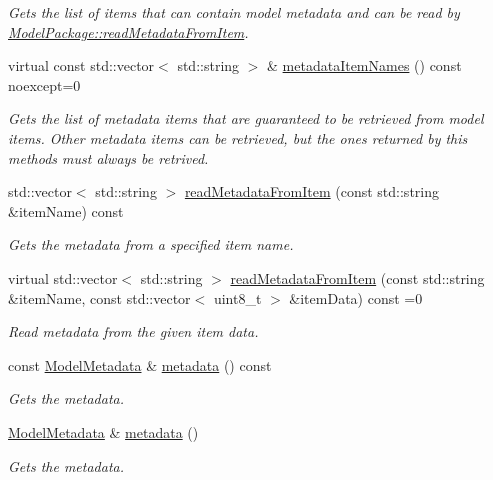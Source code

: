 \begin{DoxyCompactItemize}
\begin{DoxyCompactList}\small\item\em Gets the list of items that can contain model metadata and can be read by \hyperlink{group___classification_module_gaa50c6f125db866bddba70b958c6a1074}{Model\+Package\+::read\+Metadata\+From\+Item}. \end{DoxyCompactList}\item 
virtual const std\+::vector$<$ std\+::string $>$ \& \hyperlink{group___classification_module_ga6b5ceb1c678e1afe83dbe6e30e82960d}{metadata\+Item\+Names} () const noexcept=0
\begin{DoxyCompactList}\small\item\em Gets the list of metadata items that are guaranteed to be retrieved from model items. Other metadata items can be retrieved, but the ones returned by this methods must always be retrived. \end{DoxyCompactList}\item 
std\+::vector$<$ std\+::string $>$ \hyperlink{group___classification_module_gaa50c6f125db866bddba70b958c6a1074}{read\+Metadata\+From\+Item} (const std\+::string \&item\+Name) const 
\begin{DoxyCompactList}\small\item\em Gets the metadata from a specified item name. \end{DoxyCompactList}\item 
virtual std\+::vector$<$ std\+::string $>$ \hyperlink{group___classification_module_ga479f0578c384bfe7d21f32d4bfb33983}{read\+Metadata\+From\+Item} (const std\+::string \&item\+Name, const std\+::vector$<$ uint8\+\_\+t $>$ \&item\+Data) const =0
\begin{DoxyCompactList}\small\item\em Read metadata from the given item data. \end{DoxyCompactList}\item 
const \hyperlink{classdg_1_1deepcore_1_1classification_1_1_model_metadata}{Model\+Metadata} \& \hyperlink{group___classification_module_gaa88957807aa9cd63108033b376e60ef2}{metadata} () const 
\begin{DoxyCompactList}\small\item\em Gets the metadata. \end{DoxyCompactList}\item 
\hyperlink{classdg_1_1deepcore_1_1classification_1_1_model_metadata}{Model\+Metadata} \& \hyperlink{group___classification_module_ga1d2576e90ac787ae30dffb0920d48462}{metadata} ()
\begin{DoxyCompactList}\small\item\em Gets the metadata. \end{DoxyCompactList}\item 

\end{DoxyCompactItemize}
